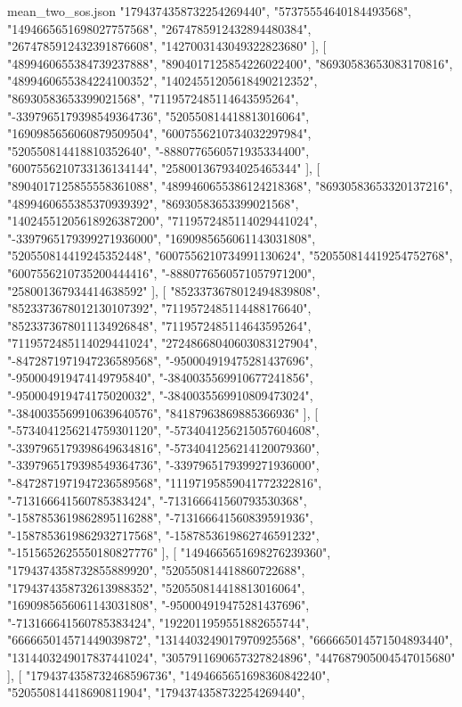 \begin{filecontents*}[overwrite]{mean_two_sos.json}
    "1794374358732254269440",
    "57375554640184493568",
    "1494665651698027757568",
    "2674785912432894480384",
    "2674785912432391876608",
    "1427003143049322823680"
   ],
   [
    "4899460655384739237888",
    "8904017125854226022400",
    "86930583653083170816",
    "4899460655384224100352",
    "14024551205618490212352",
    "86930583653399021568",
    "7119572485114643595264",
    "-3397965179398549364736",
    "520550814418813016064",
    "1690985656060879509504",
    "6007556210734032297984",
    "520550814418810352640",
    "-8880776560571935334400",
    "6007556210733136134144",
    "258001367934025465344"
   ],
   [
    "8904017125855558361088",
    "4899460655386124218368",
    "86930583653320137216",
    "4899460655385370939392",
    "86930583653399021568",
    "14024551205618926387200",
    "7119572485114029441024",
    "-3397965179399271936000",
    "1690985656061143031808",
    "520550814419245352448",
    "6007556210734991130624",
    "520550814419254752768",
    "6007556210735200444416",
    "-8880776560571057971200",
    "258001367934414638592"
   ],
   [
    "8523373678012494839808",
    "8523373678012130107392",
    "7119572485114488176640",
    "8523373678011134926848",
    "7119572485114643595264",
    "7119572485114029441024",
    "27248668040603083127904",
    "-8472871971947236589568",
    "-950004919475281437696",
    "-950004919474149795840",
    "-3840035569910677241856",
    "-950004919474175020032",
    "-3840035569910809473024",
    "-3840035569910639640576",
    "84187963869885366936"
   ],
   [
    "-5734041256214759301120",
    "-5734041256215057604608",
    "-3397965179398649634816",
    "-5734041256214120079360",
    "-3397965179398549364736",
    "-3397965179399271936000",
    "-8472871971947236589568",
    "11197195859041772322816",
    "-713166641560785383424",
    "-713166641560793530368",
    "-1587853619862895116288",
    "-713166641560839591936",
    "-1587853619862932717568",
    "-1587853619862746591232",
    "-1515652625550180827776"
   ],
   [
    "1494665651698276239360",
    "1794374358732855889920",
    "520550814418860722688",
    "1794374358732613988352",
    "520550814418813016064",
    "1690985656061143031808",
    "-950004919475281437696",
    "-713166641560785383424",
    "1922011959551882655744",
    "666665014571449039872",
    "1314403249017970925568",
    "666665014571504893440",
    "1314403249017837441024",
    "3057911690657327824896",
    "447687905004547015680"
   ],
   [
    "1794374358732468596736",
    "1494665651698360842240",
    "520550814418690811904",
    "1794374358732254269440",

\end{filecontents*}
